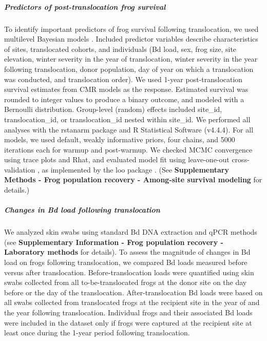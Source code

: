 \documentclass[
  letterpaper,
  DIV=11,
  numbers=noendperiod]{scrartcl}
\let\oldsubparagraph\subparagraph
\renewcommand{\subparagraph}[1]{\oldsubparagraph{#1}\mbox{}}
\begin{document}
\subparagraph{Predictors of post-translocation frog
survival}\label{predictors-of-post-translocation-frog-survival}

To identify important predictors of frog survival following
translocation, we used multilevel Bayesian models
\citep{gelman2013, gabry2019}. Included predictor variables describe
characteristics of sites, translocated cohorts, and individuals (Bd
load, sex, frog size, site elevation, winter severity in the year of
translocation, winter severity in the year following translocation,
donor population, day of year on which a translocation was conducted,
and translocation order). We used 1-year post-translocation survival
estimates from CMR models as the response. Estimated survival was
rounded to integer values to produce a binary outcome, and modeled with
a Bernoulli distribution. Group-level (random) effects included
site\_id, translocation\_id, or translocation\_id nested within
site\_id. We performed all analyses with the rstanarm package
\citep{rstanarm2022} and R Statistical Software \citep{rsoftware2022}
(v4.4.4). For all models, we used default, weakly informative priors,
four chains, and 5000 iterations each for warmup and post-warmup. We
checked MCMC convergence using trace plots and Rhat, and evaluated model
fit using leave-one-out cross-validation \citep{vehtari2016}, as
implemented by the loo package \citep{vehtari2022}. (See
\textbf{Supplementary Methods - Frog population recovery - Among-site
survival modeling} for details.)

\subparagraph{Changes in Bd load following
translocation}\label{changes-in-bd-load-following-translocation}

We analyzed skin swabs using standard Bd DNA extraction and qPCR methods
\citep{boyle2004} (see \textbf{Supplementary Information - Frog
population recovery - Laboratory methods} for details). To assess the
magnitude of changes in Bd load on frogs following translocation, we
compared Bd loads measured before versus after translocation.
Before-translocation loads were quantified using skin swabs collected
from all to-be-translocated frogs at the donor site on the day before or
the day of the translocation. After-translocation Bd loads were based on
all swabs collected from translocated frogs at the recipient site in the
year of and the year following translocation. Individual frogs and their
associated Bd loads were included in the dataset only if frogs were
captured at the recipient site at least once during the 1-year period
following translocation.
\end{document}
